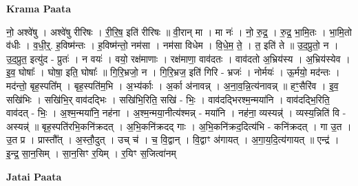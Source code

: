 \documentclass[17pt]{extarticle}
\begin{document}
\textbf{Krama Paata} \newline

नो॒ अश्वे॑षु । अश्वे॑षु रीरिषः । री॒रि॒ष॒ इति॑ रीरिषः ॥ वी॒रान् मा । मा नः॑ । नो॒ रु॒द्र॒ । रु॒द्र॒ भा॒मि॒तः । भा॒मि॒तो व॑धीः । व॒धी॒र्॒. ह॒विष्म॑न्तः । ह॒विष्म॑न्तो॒ नम॑सा । नम॑सा विधेम । वि॒धे॒म॒ ते॒ । त॒ इति॑ ते ॥ उ॒द॒प्रुतो॒ न । उ॒द॒प्रुत॒ इत्यु॑द - प्रुतः॑ । न वयः॑ । वयो॒ रक्ष॑माणाः । रक्ष॑माणा॒ वाव॑दतः । वाव॑दतो अ॒भ्रिय॑स्य । अ॒भ्रिय॑स्येव । इ॒व॒ घोषाः᳚ । घोषा॒ इति॒ घोषाः᳚ ॥ गि॒रि॒भ्रजो॒ न । गि॒रि॒भ्रज॒ इति॑ गिरि - भ्रजः॑ । नोर्मयः॑ । ऊ॒र्मयो॒ मद॑न्तः । मद॑न्तो॒ बृह॒स्पति᳚म् । बृह॒स्पति॑म॒भि । अ॒भ्य॑र्काः । अ॒र्का अ॑नावन्न् । अ॒ना॒व॒न्नि॒त्य॑नावन्न् ॥ हꣳ॒॒सैरि॑व । इ॒व॒ सखि॑भिः । सखि॑भि॒र् वाव॑दद्भिः । सखि॑भि॒रिति॒ सखि॑ - भिः॒ । वाव॑दद्भिरश्म॒न्मया॑नि । वाव॑दद्भि॒रिति॒ वाव॑दत् - भिः॒ । अ॒श्म॒न्मया॑नि॒ नह॑ना । अ॒श्म॒न्मया॒नीत्य॑श्मन्न् - मया॑नि । नह॑ना॒ व्यस्यन्न्॑ । व्यस्य॒न्निति॑ वि - अस्यन्न्॑ ॥ बृह॒स्पति॑रभि॒कनि॑क्रदत् । अ॒भि॒कनि॑क्रदद् गाः । अ॒भि॒कनि॑क्रद॒दित्य॑भि - कनि॑क्रदत् । गा उ॒त । उ॒त प्र । प्रास्तौ᳚त् । अ॒स्तौ॒दुत् । उच् च॑ । च॒ वि॒द्वान् । वि॒द्वाꣳ अ॑गायत् । अ॒गा॒य॒दि॒त्य॑गायत् ॥ एन्द्र॑ । इ॒न्द्र॒ सा॒न॒सिम् । सा॒न॒सिꣳ र॒यिम् । र॒यिꣳ स॒जित्वा॑नम् \newline

\textbf{Jatai Paata} \newline
\end{document}
